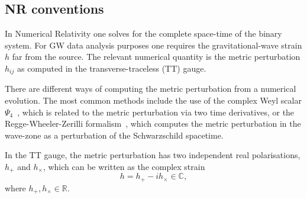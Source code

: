 \documentclass[11pt,tightenlines,article,amssymb,amsmath,amsfonts,superscriptaddress,nofootinbib]{revtex4}
\begin{document}
\subsection{NR conventions}
\label{sec:NRconv}
In Numerical Relativity one solves for the complete space-time of the
binary system. For GW data analysis purposes one requires the
gravitational-wave strain $h$ far from the source. The relevant
numerical quantity is the metric perturbation $h_{ij}$ as computed in
the transverse-traceless (TT) gauge.

There are different ways of computing the metric perturbation from a numerical evolution. The most common methods include the use of the complex Weyl scalar $\Psi_4$~\cite{Newman:1961qr, Penrose:1962ij}, which is related to the metric perturbation via two time derivatives, or the Regge-Wheeler-Zerilli formalism~\cite{Regge:1957td, Zerilli:1970se, Zerilli:1971wd, Moncrief:1974am}, which computes the metric perturbation in the wave-zone as a perturbation of the Schwarzschild spacetime. 

In the TT gauge, the metric perturbation
has two independent real polarisations, $h_+$ and $h_\times$, which can be written as the complex strain
\begin{equation}
\label{wq:Hlm}
h = h_+ - i h_\times \in \mathbb{C},
\end{equation}
where $h_+, h_\times \in \mathbb{R}$. 
\end{document}
